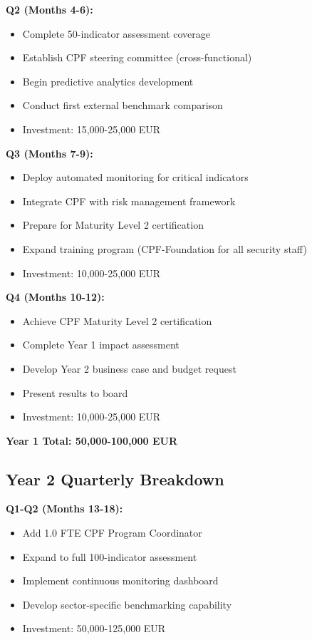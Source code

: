 \documentclass[11pt,a4paper]{article}
\begin{document}
\textbf{Q2 (Months 4-6):}
\begin{itemize}
\item Complete 50-indicator assessment coverage
\item Establish CPF steering committee (cross-functional)
\item Begin predictive analytics development
\item Conduct first external benchmark comparison
\item Investment: 15,000-25,000 EUR
\end{itemize}

\textbf{Q3 (Months 7-9):}
\begin{itemize}
\item Deploy automated monitoring for critical indicators
\item Integrate CPF with risk management framework
\item Prepare for Maturity Level 2 certification
\item Expand training program (CPF-Foundation for all security staff)
\item Investment: 10,000-25,000 EUR
\end{itemize}

\textbf{Q4 (Months 10-12):}
\begin{itemize}
\item Achieve CPF Maturity Level 2 certification
\item Complete Year 1 impact assessment
\item Develop Year 2 business case and budget request
\item Present results to board
\item Investment: 10,000-25,000 EUR
\end{itemize}

\textbf{Year 1 Total: 50,000-100,000 EUR}

\subsection{Year 2 Quarterly Breakdown}

\textbf{Q1-Q2 (Months 13-18):}
\begin{itemize}
\item Add 1.0 FTE CPF Program Coordinator
\item Expand to full 100-indicator assessment
\item Implement continuous monitoring dashboard
\item Develop sector-specific benchmarking capability
\item Investment: 50,000-125,000 EUR
\end{itemize}
\end{document}
